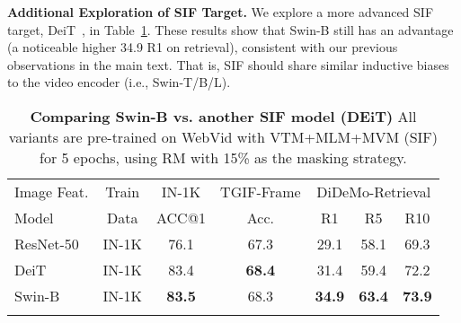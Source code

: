 \documentclass[10pt,twocolumn,letterpaper]{article}
\newlength\savewidth
\newcommand\shline{\noalign{\global\savewidth\arrayrulewidth\global\arrayrulewidth 1pt}\hline\noalign{\global\arrayrulewidth\savewidth}}
\newcommand{\tablestyle}[2]{\setlength{\tabcolsep}{#1}\renewcommand{\arraystretch}{#2}\centering\footnotesize}
\begin{document}
\vspace{0.5ex}
\noindent \textbf{Additional Exploration of SIF Target.}
We explore a more advanced SIF target, DeiT~\cite{touvron2021training}, in Table~\ref{table:mvm-sif-deit}. These results show that Swin-B still has an advantage (a noticeable higher 34.9 R1 on retrieval), consistent with our previous observations in the main text. That is, SIF should share similar inductive biases to the video encoder (i.e., Swin-T/B/L).
\begin{table}[t]
 \centering 
 \tablestyle{4.5pt}{1.2}
\begin{tabular}{l cc|cccc}
        \shline
        Image Feat. & Train & IN-1K & TGIF-Frame & \multicolumn{3}{c}{DiDeMo-Retrieval} \\
        \cmidrule(lr){3-3} \cmidrule(lr){4-4} \cmidrule(lr){5-7}
         Model & Data & ACC@1 & Acc. & R1 & R5 & R10  \\
        \hline
        ResNet-50 & IN-1K & 76.1 & 67.3 & 29.1 & 58.1 & 69.3 \\
        DeiT~\cite{touvron2021training} & IN-1K & 83.4 & \textbf{68.4} & 31.4 & 59.4 & 72.2 \\
        Swin-B & IN-1K & \textbf{83.5} & 68.3 & \textbf{34.9} & \textbf{63.4} & \textbf{73.9} \\
        \shline
    \end{tabular}
\caption{\textbf{Comparing Swin-B vs. another SIF model (DEiT)} All variants are pre-trained on WebVid with VTM+MLM+MVM (SIF) for 5 epochs, using RM with 15\% as the masking strategy.}
\label{table:mvm-sif-deit}
\end{table}
 
\end{document}
